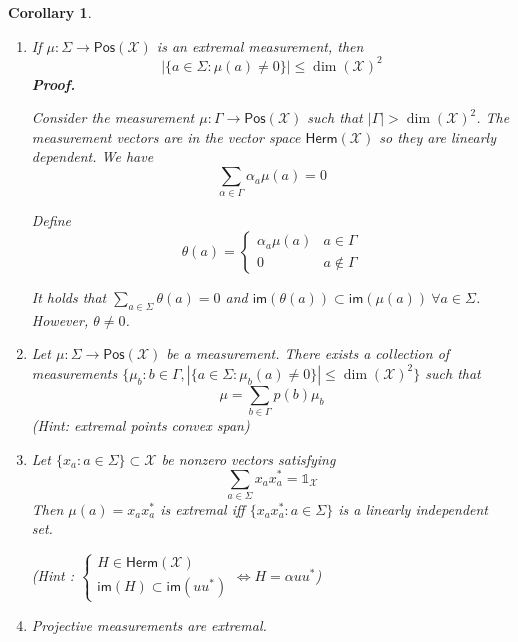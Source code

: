 \documentclass[aps,pra,onecolumn,notitlepage,superscriptaddress]{revtex4-1}
\newcommand{\spc}[1]{\mathcal{#1}}
\newcommand{\Pos}{\mathsf{Pos}}
\newcommand{\Herm}{\mathsf{Herm}}
\newcommand{\im}{\mathsf{im}}
\newcommand\I{\mathds{1}}
\newtheorem{cor}{Corollary}
\def\Proof{{\bf Proof.~}}
\begin{document}
    \begin{cor}
        \begin{enumerate}
            \item If $\mu : \Sigma \to \Pos(\spc X)$ is an extremal measurement, then
            \begin{equation}
                |\{ a \in \Sigma : \mu(a) \neq 0 \}| \leq \dim(\spc X)^2
            \end{equation}
            \Proof {
                Consider the measurement $\mu : \Gamma \to \Pos(\spc X)$ such that $|\Gamma| > \dim(\spc X)^2$. The measurement vectors are in the vector space $\Herm(\spc X)$ so they are linearly dependent. We have 
                \begin{equation}
                    \sum_{\alpha \in \Gamma} \alpha_a \mu(a) = 0
                \end{equation}
                
                Define
                \begin{equation}
                    \theta(a) = \begin{cases}
                        \alpha_a \mu(a) & a \in \Gamma \\
                        0 & a \notin \Gamma
                    \end{cases}
                \end{equation}

                It holds that $\sum_{a \in \Sigma} \theta(a) = 0$ and $\im(\theta(a)) \subset \im(\mu(a)) \ \forall a \in \Sigma$. However, $\theta \neq 0$.
            }

            \item Let $\mu : \Sigma \to \Pos(\spc X)$ be a measurement. There exists a collection of measurements $\{ \mu_b : b \in \Gamma, |\{ a \in \Sigma : \mu_b(a) \neq 0 \}| \leq \dim(\spc X)^2 \}$ such that
            \begin{equation}
                \mu = \sum_{b \in \Gamma} p(b)\mu_b
            \end{equation}
            (Hint: extremal points convex span)
            \item Let $\{ x_a : a \in \Sigma \} \subset \spc X$ be nonzero vectors satisfying
            \begin{equation}
                \sum_{a \in \Sigma} x_ax_a^* = \I_{\spc X}
            \end{equation}
            Then $\mu(a) = x_ax_a^*$ is extremal iff $\{ x_ax_a^* : a \in \Sigma \}$ is a linearly independent set.

            (Hint : $\begin{cases}
                H \in \Herm(\spc X) \\
                \im(H) \subset \im(uu^*)
            \end{cases} \Leftrightarrow H = \alpha uu^*$)
            \item  Projective measurements are extremal.
        \end{enumerate}
    \end{cor}
\end{document}
